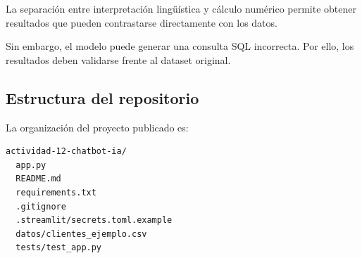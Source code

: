 \documentclass[11pt,a4paper]{article}
\begin{document}
\begin{center}
\end{center}

La separación entre interpretación lingüística
y cálculo numérico permite obtener resultados
que pueden contrastarse directamente con los datos.

Sin embargo, el modelo puede generar una consulta
SQL incorrecta. Por ello, los resultados deben
validarse frente al dataset original.

\subsection{Estructura del repositorio}

La organización del proyecto publicado es:

\begin{lstlisting}
actividad-12-chatbot-ia/
  app.py
  README.md
  requirements.txt
  .gitignore
  .streamlit/secrets.toml.example
  datos/clientes_ejemplo.csv
  tests/test_app.py
\end{lstlisting}
\end{document}
